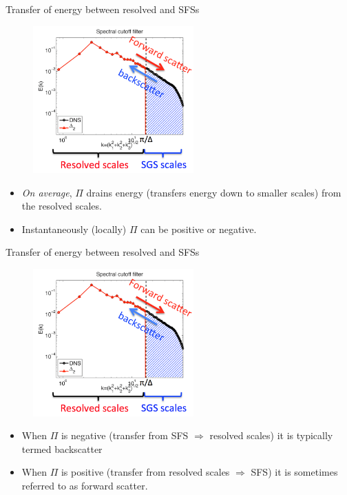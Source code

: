 
\begin{frame}{Transfer of energy between resolved and SFSs}

\begin{figure}
	\includegraphics[width=0.55\textwidth]{scales.png}
\end{figure}
 \begin{itemize}
	\item \textit{On average}, $\Pi$ drains energy (transfers energy down to smaller scales) from the resolved scales.
	\item Instantaneously (locally) $\Pi$ can be positive or negative.
\end{itemize}
\end{frame}


\begin{frame}{Transfer of energy between resolved and SFSs}

\begin{figure}
	\includegraphics[width=0.55\textwidth]{scales.png}
\end{figure}
\begin{itemize}
	\item When $\Pi$ is negative (transfer from SFS $\Rightarrow$ resolved scales) it is typically termed backscatter
	\item When $\Pi$ is positive (transfer from resolved scales $\Rightarrow$ SFS) it is sometimes referred to as forward scatter.
\end{itemize}
\end{frame}


